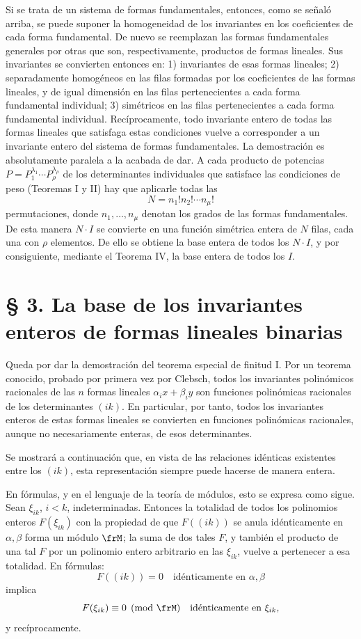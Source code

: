 \documentclass[11pt]{article}
\begin{document}
Si se trata de un sistema de formas fundamentales, entonces, como se señaló arriba, se puede suponer la homogeneidad de los invariantes en los coeficientes de cada forma fundamental. De nuevo se reemplazan las formas fundamentales generales por otras que son, respectivamente, productos de formas lineales. Sus invariantes se convierten entonces en: 1) invariantes de esas formas lineales; 2) separadamente homogéneos en las filas formadas por los coeficientes de las formas lineales, y de igual dimensión en las filas pertenecientes a cada forma fundamental individual; 3) simétricos en las filas pertenecientes a cada forma fundamental individual. Recíprocamente, todo invariante entero de todas las formas lineales que satisfaga estas condiciones vuelve a corresponder a un invariante entero del sistema de formas fundamentales. La demostración es absolutamente paralela a la acabada de dar. A cada producto de potencias \(P=P_1^{\lambda_1}\cdots P_\rho^{\lambda_\rho}\) de los determinantes individuales que satisface las condiciones de peso (Teoremas I y II) hay que aplicarle todas las
\[
        N=n_1!n_2!\cdots n_\mu!
\]
permutaciones, donde \(n_1,\ldots,n_\mu\) denotan los grados de las formas fundamentales. De esta manera \(N\cdot I\) se convierte en una función simétrica entera de \(N\) filas, cada una con \(\rho\) elementos. De ello se obtiene la base entera de todos los \(N\cdot I\), y por consiguiente, mediante el Teorema IV, la base entera de todos los \(I\).

\setcounter{equation}{0}
\section*{§ 3. La base de los invariantes enteros de formas lineales binarias}

Queda por dar la demostración del teorema especial de finitud I. Por un teorema conocido, probado por primera vez por Clebsch, todos los invariantes polinómicos racionales de las \(n\) formas lineales \(\alpha_i x+\beta_i y\) son funciones polinómicas racionales de los determinantes \((ik)\). En particular, por tanto, todos los invariantes enteros de estas formas lineales se convierten en funciones polinómicas racionales, aunque no necesariamente enteras, de esos determinantes.

Se mostrará a continuación que, en vista de las relaciones idénticas existentes entre los \((ik)\), esta representación siempre puede hacerse de manera entera.

En fórmulas, y en el lenguaje de la teoría de módulos, esto se expresa como sigue. Sean \(\xi_{ik}\), \(i<k\), indeterminadas. Entonces la totalidad de todos los polinomios enteros \(F(\xi_{ik})\) con la propiedad de que \(F((ik))\) se anula idénticamente en \(\alpha,\beta\) forma un módulo \(\frM\); la suma de dos tales \(F\), y también el producto de una tal \(F\) por un polinomio entero arbitrario en las \(\xi_{ik}\), vuelve a pertenecer a esa totalidad. En fórmulas:
\[
        F((ik))=0\quad \text{idénticamente en \(\alpha,\beta\)}
\]
implica
\[
        F(\xi_{ik})\equiv0\pmod{\frM}\quad \text{idénticamente en \(\xi_{ik}\)},
\]
y recíprocamente.
\end{document}
